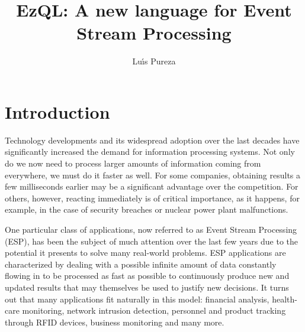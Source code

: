 \documentclass{report}
\begin{document}
\title{EzQL: A new language for Event Stream Processing}
\author{Lu\'{\i}s Pureza}

\maketitle

\tableofcontents

\addtolength{\parskip}{\baselineskip}
\chapter{Introduction}
\label{chap:introduction}

Technology developments and its widespread adoption over the last
decades have significantly increased the demand for information
processing systems. Not only do we now need to process larger amounts
of information coming from everywhere, we must do it faster as
well. For some companies, obtaining results a few milliseconds earlier
may be a significant advantage over the competition. For others,
however, reacting immediately is of critical importance, as it
happens, for example, in the case of security breaches or nuclear
power plant malfunctions.

One particular class of applications, now referred to as Event Stream
Processing (ESP), has been the subject of much attention over the last
few years due to the potential it presents to solve many real-world
problems. ESP applications are characterized by dealing with a
possible infinite amount of data constantly flowing in to be processed
as fast as possible to continuously produce new and updated results
that may themselves be used to justify new decisions. It turns out
that many applications fit naturally in this model: financial
analysis, health-care monitoring, network intrusion detection,
personnel and product tracking through RFID devices, business
monitoring and many more.
\end{document}
